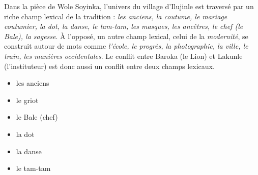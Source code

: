 \documentclass[11pt]{article}
\begin{document}
\begin{exemplebox}
Dans la pièce de Wole Soyinka, l'univers du village d'Ilujinle est traversé par un riche champ lexical de la tradition : \emph{les anciens, la coutume, le mariage coutumier, la dot, la danse, le tam-tam, les masques, les ancêtres, le chef (le Bale), la sagesse}. À l'opposé, un autre champ lexical, celui de la \emph{modernité}, se construit autour de mots comme \emph{l'école, le progrès, la photographie, la ville, le train, les manières occidentales}. Le conflit entre Baroka (le Lion) et Lakunle (l'instituteur) est donc aussi un conflit entre deux champs lexicaux.
\end{exemplebox}

\begin{popfigure}
\begin{center}\end{center}
\vspace{-2pt}
\begin{tcbraster}[raster columns=2,raster equal height=rows,raster column skip=6pt,raster row skip=6pt,enhanced,blankest]
\begin{tcolorbox}[enhanced,colback=white,colframe=popblue,boxrule=0.9pt,arc=3pt,title={Personnes},fonttitle=\bfseries\scriptsize,coltitle=white,colbacktitle=popblue,left=4pt,right=4pt,top=2pt,bottom=2pt,boxsep=1pt,toptitle=1.5pt,bottomtitle=1.5pt,halign=left]
\begin{itemize}[nosep,leftmargin=*,itemsep=1pt,font=\scriptsize]
\item les anciens
\item le griot
\item le Bale (chef)
\end{itemize}
\end{tcolorbox}
\begin{tcolorbox}[enhanced,colback=white,colframe=poporange,boxrule=0.9pt,arc=3pt,title={Pratiques},fonttitle=\bfseries\scriptsize,coltitle=white,colbacktitle=poporange,left=4pt,right=4pt,top=2pt,bottom=2pt,boxsep=1pt,toptitle=1.5pt,bottomtitle=1.5pt,halign=left]
\begin{itemize}[nosep,leftmargin=*,itemsep=1pt,font=\scriptsize]
\item la dot
\item la danse
\item le tam-tam
\end{itemize}

\end{tcolorbox}
\end{tcbraster}
\end{popfigure}
\end{document}
